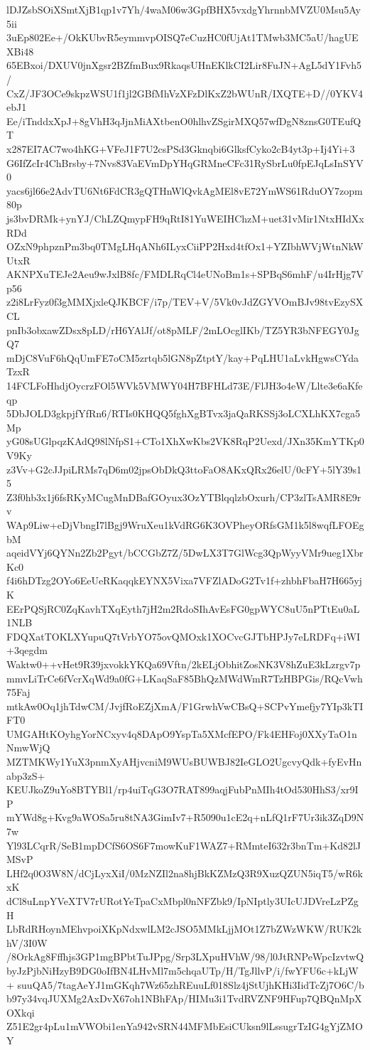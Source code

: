 lDJZsbSOiXSmtXjB1qp1v7Yh/4waM06w3GpfBHX5vxdgYhrnnbMVZU0Msu5Ay5ii
3uEp802Ee+/OkKUbvR5eymmvpOISQ7eCuzHC0fUjAt1TMwb3MC5aU/hagUEXBi48
65EBxoi/DXUV0jnXgsr2BZfmBux9RkaqsUHnEKlkCI2Lir8FuJN+AgL5dY1Fvh5/
CxZ/JF3OCe9skpzWSU1f1jl2GBfMhVzXFzDlKxZ2bWUnR/IXQTE+D//0YKV4ebJ1
Ee/iTnddxXpJ+8gVhH3qJjnMiAXtbenO0hlhvZSgirMXQ57wfDgN8znsG0TEufQT
x287EI7AC7wo4hKG+VFeJ1F7U2csPSd3Gknqbi6GlksfCyko2cB4yt3p+Ij4Yi+3
G6IfZcIr4ChBrsby+7Nvs83VaEVmDpYHqGRMneCFc31RySbrLu0fpEJqLsInSYV0
yacs6jl66e2AdvTU6Nt6FdCR3gQTHnWlQvkAgMEl8vE72YmWS61RduOY7zopm80p
js3bvDRMk+ynYJ/ChLZQmypFH9qRtI81YuWEIHChzM+uet31vMir1NtxHIdXxRDd
OZxN9phpznPm3bq0TMgLHqANh6ILyxCiiPP2Hxd4tfOx1+YZIbhWVjWtnNkWUtxR
AKNPXuTEJe2Aeu9wJxlB8fc/FMDLRqCl4eUNoBm1s+SPBqS6mhF/u4IrHjg7Vp56
z2i8LrFyz0f3gMMXjxleQJKBCF/i7p/TEV+V/5Vk0vJdZGYVOmBJv98tvEzySXCL
pnIb3obxawZDsx8pLD/rH6YAlJf/ot8pMLF/2mLOcglIKb/TZ5YR3bNFEGY0JgQ7
mDjC8VuF6hQqUmFE7oCM5zrtqb5lGN8pZtptY/kay+PqLHU1aLvkHgwsCYdaTzxR
14FCLFoHhdjOycrzFOl5WVk5VMWY04H7BFHLd73E/FlJH3o4eW/Llte3e6aKfeqp
5DbJOLD3gkpjfYfRn6/RTIs0KHQQ5fghXgBTvx3jaQaRKSSj3oLCXLhKX7cga5Mp
yG08sUGlpqzKAdQ98lNfpS1+CTo1XhXwKbs2VK8RqP2Uexd/JXn35KmYTKp0V9Ky
z3Vv+G2cJJpiLRMs7qD6m02jpsObDkQ3ttoFaO8AKxQRx26elU/0cFY+5lY39s15
Z3f0hb3x1j6fsRKyMCugMnDBafGOyux3OzYTBlqqlzbOxurh/CP3zlTsAMR8E9rv
WAp9Liw+eDjVbngI7lBgj9WruXeu1kVdRG6K3OVPheyORfsGM1k5l8wqfLFOEgbM
aqeidVYj6QYNn2Zb2Pgyt/bCCGbZ7Z/5DwLX3T7GlWcg3QpWyyVMr9ueg1XbrKc0
f4i6hDTzg2OYo6EeUeRKaqqkEYNX5Vixa7VFZlADoG2Tv1f+zhbhFbaH7H665yjK
EErPQSjRC0ZqKavhTXqEyth7jH2m2RdoSIhAvEsFG0gpWYC8uU5nPTtEu0aL1NLB
FDQXatTOKLXYupuQ7tVrbYO75ovQMOxk1XOCvcGJTbHPJy7eLRDFq+iWI+3qegdm
Waktw0++vHet9R39jxvokkYKQa69Vftn/2kELjObhitZosNK3V8hZuE3kLzrgv7p
mmvLiTrCe6fVcrXqWd9a0fG+LKaqSaF85BhQzMWdWmR7TzHBPGis/RQcVwh75Faj
mtkAw0Oq1jhTdwCM/JvjfRoEZjXmA/F1GrwhVwCBsQ+SCPvYmefjy7YIp3kTIFT0
UMGAHtKOyhgYorNCxyv4q8DApO9YspTa5XMcfEPO/Fk4EHFoj0XXyTaO1nNmwWjQ
MZTMKWy1YuX3pnmXyAHjvcniM9WUsBUWBJ82IeGLO2UgcvyQdk+fyEvHnabp3zS+
KEUJkoZ9uYo8BTYBl1/rp4uiTqG3O7RAT899aqjFubPnMIh4tOd530HhS3/xr9IP
mYWd8g+Kvg9aWOSa5ru8tNA3GimIv7+R5090u1cE2q+nLfQ1rF7Ur3ik3ZqD9N7w
Yl93LCqrR/SeB1mpDCfS6OS6F7mowKuF1WAZ7+RMmteI632r3bnTm+Kd82lJMSvP
LHf2q0O3W8N/dCjLyxXiI/0MzNZIl2na8hjBkKZMzQ3R9XuzQZUN5iqT5/wR6kxK
dCl8uLnpYVeXTV7rURotYeTpaCxMbpl0nNFZbk9/IpNIptly3UIcUJDVreLzPZgH
LbRdRHoynMEhvpoiXKpNdxwlLM2cJSO5MMkLjjMOt1Z7bZWzWKW/RUK2khV/3I0W
/8OrkAg8Fffhjs3GP1mgBPbtTuJPpg/Srp3LXpuHVhW/98/l0JtRNPeWpcIzvtwQ
byJzPjbNiHzyB9DG0oIfBN4LHvMl7m5chqaUTp/H/TgJllvP/i/fwYFU6c+kLjW+
suuQA5/7tagAeYJ1mGKqh7Wz65zhREuuLf018Slz4jStUjhKHi3IidTcZj7O6C/b
b97y34vqJUXMg2AxDvX67oh1NBhFAp/HIMu3i1TvdRVZNF9HFup7QBQnMpXOXkqi
Z51E2gr4pLu1mVWObi1enYa942vSRN44MFMbEsiCUksn9lLssugrTzIG4gYjZMOY
